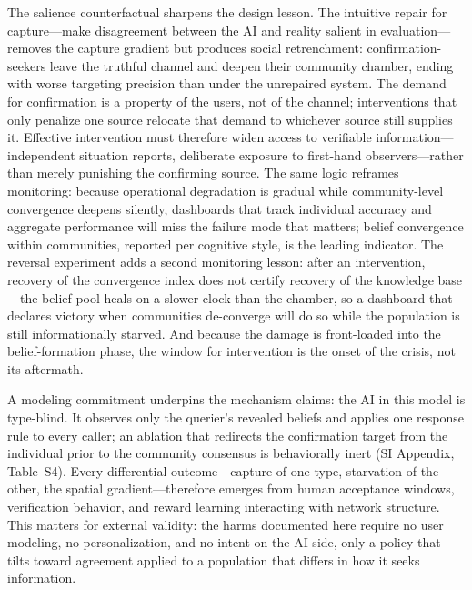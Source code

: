 \documentclass[pdflatex,sn-nature]{sn-jnl}
\begin{document}
The salience counterfactual sharpens the design lesson. The intuitive repair for capture---make disagreement between the AI and reality salient in evaluation---removes the capture gradient but produces social retrenchment: confirmation-seekers leave the truthful channel and deepen their community chamber, ending with worse targeting precision than under the unrepaired system. The demand for confirmation is a property of the users, not of the channel; interventions that only penalize one source relocate that demand to whichever source still supplies it. Effective intervention must therefore widen access to verifiable information---independent situation reports, deliberate exposure to first-hand observers---rather than merely punishing the confirming source. The same logic reframes monitoring: because operational degradation is gradual while community-level convergence deepens silently, dashboards that track individual accuracy and aggregate performance will miss the failure mode that matters; belief convergence within communities, reported per cognitive style, is the leading indicator. The reversal experiment adds a second monitoring lesson: after an intervention, recovery of the convergence index does not certify recovery of the knowledge base---the belief pool heals on a slower clock than the chamber, so a dashboard that declares victory when communities de-converge will do so while the population is still informationally starved. And because the damage is front-loaded into the belief-formation phase, the window for intervention is the onset of the crisis, not its aftermath.

A modeling commitment underpins the mechanism claims: the AI in this model is type-blind. It observes only the querier's revealed beliefs and applies one response rule to every caller; an ablation that redirects the confirmation target from the individual prior to the community consensus is behaviorally inert (SI Appendix, Table~S4). Every differential outcome---capture of one type, starvation of the other, the spatial gradient---therefore emerges from human acceptance windows, verification behavior, and reward learning interacting with network structure. This matters for external validity: the harms documented here require no user modeling, no personalization, and no intent on the AI side, only a policy that tilts toward agreement applied to a population that differs in how it seeks information.
\end{document}
